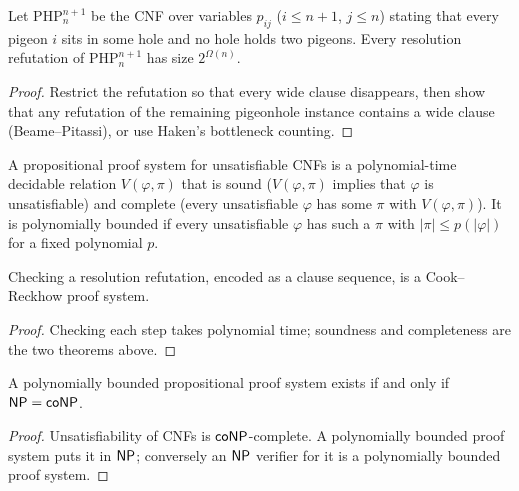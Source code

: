 \begin{theorem}[Haken]
  \label{thm:lowerbounds-php}
  \notready
  Let $\mathrm{PHP}^{n+1}_n$ be the CNF over variables $p_{ij}$
  ($i \le n + 1$, $j \le n$) stating that every pigeon $i$ sits in some hole
  and no hole holds two pigeons. Every resolution refutation of
  $\mathrm{PHP}^{n+1}_n$ has size $2^{\Omega(n)}$.
\end{theorem}
\begin{proof}
  Restrict the refutation so that every wide clause disappears, then show that
  any refutation of the remaining pigeonhole instance contains a wide clause
  (Beame--Pitassi), or use Haken's bottleneck counting.
\end{proof}

\begin{definition}
  \label{def:lowerbounds-proof-system}
  A propositional proof system for unsatisfiable CNFs is a polynomial-time
  decidable relation $V(\varphi, \pi)$ that is sound ($V(\varphi, \pi)$
  implies that $\varphi$ is unsatisfiable) and complete (every unsatisfiable
  $\varphi$ has some $\pi$ with $V(\varphi, \pi)$). It is polynomially bounded
  if every unsatisfiable $\varphi$ has such a $\pi$ with
  $|\pi| \le p(|\varphi|)$ for a fixed polynomial $p$.
\end{definition}

\begin{proposition}
  \label{prop:lowerbounds-resolution-proof-system}
  \notready
  Checking a resolution refutation, encoded as a clause sequence, is a
  Cook--Reckhow proof system.
\end{proposition}
\begin{proof}
  Checking each step takes polynomial time; soundness and completeness are the
  two theorems above.
\end{proof}

\begin{theorem}
  \label{thm:lowerbounds-cook-reckhow}
  \notready
  A polynomially bounded propositional proof system exists if and only if
  $\mathsf{NP} = \mathsf{coNP}$.
\end{theorem}
\begin{proof}
  Unsatisfiability of CNFs is $\mathsf{coNP}$-complete. A polynomially bounded
  proof system puts it in $\mathsf{NP}$; conversely an $\mathsf{NP}$ verifier for it is
  a polynomially bounded proof system.
\end{proof}


